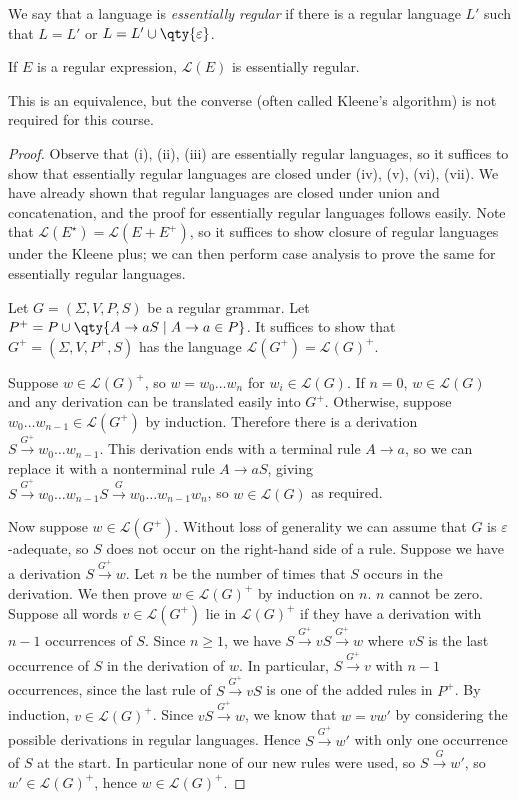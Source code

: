 We say that a language is \emph{essentially regular} if there is a regular language \( L' \) such that \( L = L' \) or \( L = L' \cup \qty{\varepsilon} \).
\begin{theorem}
	If \( E \) is a regular expression, \( \mathcal L(E) \) is essentially regular.
\end{theorem}
This is an equivalence, but the converse (often called Kleene's algorithm) is not required for this course.
\begin{proof}
	Observe that (i), (ii), (iii) are essentially regular languages, so it suffices to show that essentially regular languages are closed under (iv), (v), (vi), (vii).
	We have already shown that regular languages are closed under union and concatenation, and the proof for essentially regular languages follows easily.
	Note that \( \mathcal L(E^\star) = \mathcal L(E + E^+) \), so it suffices to show closure of regular languages under the Kleene plus; we can then perform case analysis to prove the same for essentially regular languages.

	Let \( G = (\Sigma, V, P, S) \) be a regular grammar.
	Let \( P^+ = P \cup \qty{A \to aS \mid A \to a \in P} \).
	It suffices to show that \( G^+ = (\Sigma, V, P^+, S) \) has the language \( \mathcal L(G^+) = \mathcal L(G)^+ \).

	Suppose \( w \in \mathcal L(G)^+ \), so \( w = w_0 \dots w_n \) for \( w_i \in \mathcal L(G) \).
	If \( n = 0 \), \( w \in \mathcal L(G) \) and any derivation can be translated easily into \( G^+ \).
	Otherwise, suppose \( w_0 \dots w_{n-1} \in \mathcal L(G^+) \) by induction.
	Therefore there is a derivation \( S \xrightarrow{G^+} w_0 \dots w_{n-1} \).
	This derivation ends with a terminal rule \( A \to a \), so we can replace it with a nonterminal rule \( A \to aS \), giving \( S \xrightarrow{G^+} w_0 \dots w_{n-1} S \xrightarrow{G} w_0 \dots w_{n-1} w_n \), so \( w \in \mathcal L(G) \) as required.

	Now suppose \( w \in \mathcal L(G^+) \).
	Without loss of generality we can assume that \( G \) is \( \varepsilon \)-adequate, so \( S \) does not occur on the right-hand side of a rule.
	Suppose we have a derivation \( S \xrightarrow{G^+} w \).
	Let \( n \) be the number of times that \( S \) occurs in the derivation.
	We then prove \( w \in \mathcal L(G)^+ \) by induction on \( n \).
	\( n \) cannot be zero.
	Suppose all words \( v \in \mathcal L(G^+) \) lie in \( \mathcal L(G)^+ \) if they have a derivation with \( n-1 \) occurrences of \( S \).
	Since \( n \geq 1 \), we have \( S \xrightarrow{G^+} vS \xrightarrow{G^+} w \) where \( vS \) is the last occurrence of \( S \) in the derivation of \( w \).
	In particular, \( S \xrightarrow{G^+} v \) with \( n - 1 \) occurrences, since the last rule of \( S \xrightarrow{G^+} vS \) is one of the added rules in \( P^+ \).
	By induction, \( v \in \mathcal L(G)^+ \).
	Since \( vS \xrightarrow{G^+} w \), we know that \( w = vw' \) by considering the possible derivations in regular languages.
	Hence \( S \xrightarrow{G^+} w' \) with only one occurrence of \( S \) at the start.
	In particular none of our new rules were used, so \( S \xrightarrow G w' \), so \( w' \in \mathcal L(G)^+ \), hence \( w \in \mathcal L(G)^+ \).
\end{proof}

